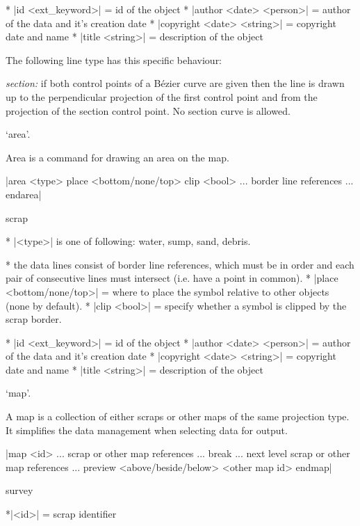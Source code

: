 \options
  * |id <ext_keyword>| = id of the object
  * |author <date> <person>| = author of the data and it's creation date
  * |copyright <date> <string>| = copyright date and name
  * |title <string>| = description of the object
\endoptions

\notes
   The following line type has this specific behaviour:

   \list
       {\it section:} if both control points of a B\'ezier curve are given 
       then the line is drawn up to the perpendicular projection of 
       the first control point and from the projection of the section control
       point. No section curve is allowed.
   \endlist
\endnotes


\subsubchapter `area'.

\description
Area is a command for drawing an area on the map.
\enddescription

\syntax
  |area <type>
         place <bottom/none/top>
         clip <bool>
       ... border line references ...
       endarea|
\endsyntax

\context
  scrap
\endcontext

\arguments
  * |<type>| is one of following: water, sump, sand, debris.
\endarguments

\comopt
  * the data lines consist of border line references, which must be 
    in order and each pair of consecutive lines must intersect 
    (i.e. have a point in common).
  * |place <bottom/none/top>| = where to place the symbol relative
    to other objects (none by default).
  * |clip <bool>| = specify whether a symbol is clipped by the scrap border.
\endcomopt

\options
  * |id <ext_keyword>| = id of the object
  * |author <date> <person>| = author of the data and it's creation date
  * |copyright <date> <string>| = copyright date and name
  * |title <string>| = description of the object
\endoptions


\subsubchapter `map'.

\description
  A map is a collection of either scraps or other maps of the same projection type.
  It simplifies the data management when selecting data for output.
\enddescription

\syntax
  |map <id>
        ... scrap or other map references ...
        break
        ... next level scrap or other map references ...
        preview <above/beside/below> <other map id>
      endmap|
\endsyntax

\context
  survey
\endcontext

\arguments
  *|<id>| = scrap identifier
\endarguments

